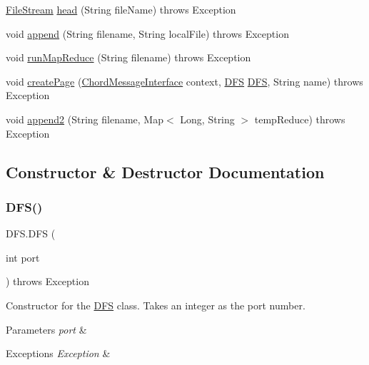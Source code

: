 \begin{DoxyCompactItemize}
\item 
\mbox{\hyperlink{class_file_stream}{File\+Stream}} \mbox{\hyperlink{class_d_f_s_a73915159a4290c3832635b6c4338ff7e}{head}} (String file\+Name)  throws Exception     
\item 
void \mbox{\hyperlink{class_d_f_s_ab2e55db638f5d15efabd544d9a3c4a5f}{append}} (String filename, String local\+File)  throws Exception     
\item 
void \mbox{\hyperlink{class_d_f_s_a51479394a5d22157cc1ee1244d294d00}{run\+Map\+Reduce}} (String filename)  throws Exception     
\item 
void \mbox{\hyperlink{class_d_f_s_a8de3017e98033a0a43c9832fcc15f797}{create\+Page}} (\mbox{\hyperlink{interface_chord_message_interface}{Chord\+Message\+Interface}} context, \mbox{\hyperlink{class_d_f_s}{D\+FS}} \mbox{\hyperlink{class_d_f_s}{D\+FS}}, String name)  throws Exception    
\item 
void \mbox{\hyperlink{class_d_f_s_a6144b8f9a96198128d178badde49d8dc}{append2}} (String filename, Map$<$ Long, String $>$ temp\+Reduce)  throws Exception     
\end{DoxyCompactItemize}


\subsection{Constructor \& Destructor Documentation}
\mbox{\label{class_d_f_s_ad863806217afcce82e64f5d7d4c124ad}} 
\subsubsection{\texorpdfstring{D\+F\+S()}{DFS()}}
{\footnotesize\ttfamily D\+F\+S.\+D\+FS (\begin{DoxyParamCaption}\item[{int}]{port }\end{DoxyParamCaption}) throws Exception\hspace{0.3cm}{\ttfamily [inline]}}

Constructor for the \mbox{\hyperlink{class_d_f_s}{D\+FS}} class. Takes an integer as the port number. 
\begin{DoxyParams}{Parameters}
{\em port} & \\
\hline
\end{DoxyParams}

\begin{DoxyExceptions}{Exceptions}
{\em Exception} & \\
\hline
\end{DoxyExceptions}


